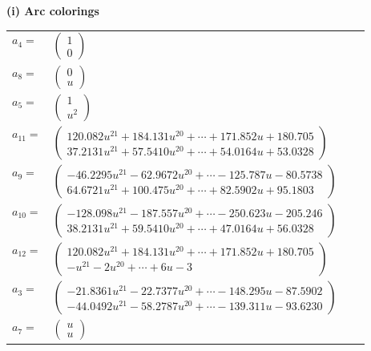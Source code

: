 \documentclass[1p]{elsarticle_modified}
\theoremstyle{definition}
\begin{document}
\flushleft \textbf{(i) Arc colorings}\\
\begin{tabular}{m{7pt} m{180pt} m{7pt} m{180pt} }
\flushright $a_{4}=$&$\begin{pmatrix}1\\0\end{pmatrix}$ \\
\flushright $a_{8}=$&$\begin{pmatrix}0\\u\end{pmatrix}$ \\
\flushright $a_{5}=$&$\begin{pmatrix}1\\u^2\end{pmatrix}$ \\
\flushright $a_{11}=$&$\begin{pmatrix}120.082 u^{21}+184.131 u^{20}+\cdots+171.852 u+180.705\\37.2131 u^{21}+57.5410 u^{20}+\cdots+54.0164 u+53.0328\end{pmatrix}$ \\
\flushright $a_{9}=$&$\begin{pmatrix}-46.2295 u^{21}-62.9672 u^{20}+\cdots-125.787 u-80.5738\\64.6721 u^{21}+100.475 u^{20}+\cdots+82.5902 u+95.1803\end{pmatrix}$ \\
\flushright $a_{10}=$&$\begin{pmatrix}-128.098 u^{21}-187.557 u^{20}+\cdots-250.623 u-205.246\\38.2131 u^{21}+59.5410 u^{20}+\cdots+47.0164 u+56.0328\end{pmatrix}$ \\
\flushright $a_{12}=$&$\begin{pmatrix}120.082 u^{21}+184.131 u^{20}+\cdots+171.852 u+180.705\\- u^{21}-2 u^{20}+\cdots+6 u-3\end{pmatrix}$ \\
\flushright $a_{3}=$&$\begin{pmatrix}-21.8361 u^{21}-22.7377 u^{20}+\cdots-148.295 u-87.5902\\-44.0492 u^{21}-58.2787 u^{20}+\cdots-139.311 u-93.6230\end{pmatrix}$ \\
\flushright $a_{7}=$&$\begin{pmatrix}u\\u\end{pmatrix}$ \\

\end{tabular}
\end{document}
